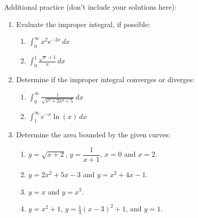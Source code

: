 \documentclass[12pt]{article}
\newcommand{\di}{\displaystyle}
\begin{document}
Additional practice (don't include your solutions here):
\begin{enumerate}
\item Evaluate the improper integral, if possible:

\begin{multicols}{2}
\begin{enumerate}
 \item $\di \int_0^\infty x^2e^{-2x}\,dx$
 \item $\di \int_0^1 \frac{\sqrt{x}+1}{x}\,dx$
 \end{enumerate}  
\end{multicols}
 \item Determine if the improper integral converges or diverges:
 \begin{multicols}{2}
 \begin{enumerate}
  \item $\di \int_0^\infty \frac{1}{\sqrt{x^3+2x^2+5}}\,dx$
  \item $\di \int_1^\infty e^{-x}\ln(x)\,dx$
 \end{enumerate}
 \end{multicols}
 \item Determine the area bounded by the given curves:
 \begin{multicols}{2}
 \begin{enumerate}
 \item $y=\sqrt{x+2}$, $y=\dfrac{1}{x+1}$, $x=0$ and $x=2$.
 \item $y=2x^2+5x-3$ and $y=x^2+4x-1$.
  \item $y=x$ and $y=x^3$.
   \item $y=x^2+1$, $y=\frac{1}{4}(x-3)^2+1$, and $y=1$.
 \end{enumerate}
 \end{multicols}
\end{enumerate}

\newpage

\end{document}
